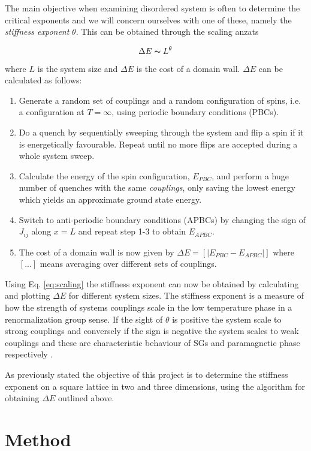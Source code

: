 \documentclass[paper=a4, fontsize=11pt]{scrartcl} %
\numberwithin{equation}{section} %
\numberwithin{figure}{section} %
\numberwithin{table}{section} %
\newcommand{\commutator}[1]{\ensuremath{\left[ #1 \right]}}
\begin{document}
The main objective when examining disordered system is often to determine the critical exponents and we will concern ourselves with one of these, namely the \emph{stiffness exponent} $\theta$. This can be obtained through the scaling anzats

\begin{equation}
\Delta E \thicksim L^\theta
\label{eq:scaling}
\end{equation}
where $L$ is the system size and $\Delta E$ is the cost of a domain wall. $\Delta E$ can be calculated as follows:

\begin{enumerate}
\item Generate a random set of couplings and a random configuration of spins, i.e. a configuration at $T=\infty$, using periodic boundary conditions (PBCs).
\item Do a quench by sequentially sweeping through the system and flip a spin if it is energetically favourable. Repeat until no more flips are accepted during a whole system sweep.
\item Calculate the energy of the spin configuration, $E_{PBC}$, and perform a huge number of quenches with the same \emph{couplings}, only saving the lowest energy which yields an approximate ground state energy.
\item Switch to anti-periodic boundary conditions (APBCs) by changing the sign of $J_{ij}$ along $x=L$ and repeat step 1-3 to obtain $E_{APBC}$.
\item The cost of a domain wall is now given by $\Delta E = \commutator{|E_{PBC}-E_{APBC}|}$ where $[...]$ means averaging over different sets of couplings.
\end{enumerate}
Using Eq. \eqref{eq:scaling} the stiffness exponent can now be obtained by calculating and plotting $\Delta E$ for different system sizes. The stiffness exponent is a measure of how the strength of systems couplings scale in the low temperature phase in a renormalization group sense. If the sight of $\theta$ is positive the system scale to strong couplings and conversely if the sign is negative the system scales to weak couplings and these are characteristic behaviour of SGs and paramagnetic phase respectively \cite{almeida}. 

As previously stated the objective of this project is to determine the stiffness exponent on a square lattice in two and three dimensions, using the algorithm for obtaining $\Delta E$ outlined above.

\section{Method}
\label{sec:method}
\end{document}
